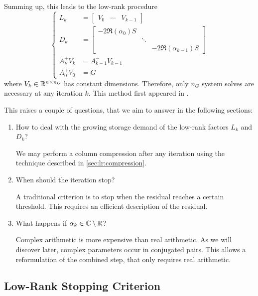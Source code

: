 Summing up,
this leads to the low-rank procedure
\begin{equation}
\label{eq:adi:si-lr-adi}
\left\{
\begin{aligned}
  L_k &= \begin{bmatrix}
    V_0 &
    \cdots &
    V_{k-1}
  \end{bmatrix} \\
  D_k &= \begin{bmatrix}
    -2 \Re(\alpha_0) S \\
    & \ddots \\
    && -2 \Re(\alpha_{k-1}) S
  \end{bmatrix} \\
  A_k^+ V_k &= A_{k-1}^- V_{k-1} \\
  A_0^+ V_0 &= G
\end{aligned}
\right.
\end{equation}
where $V_k \in\mathbb{R}^{n\times n_G}$ has constant dimensions.
Therefore, only $n_G$ system solves are necessary at any iteration $k$.
This method first appeared in \cite[Section~5]{Benner2009}.

This raises a couple of questions,
that we aim to answer in the following sections:
\begin{enumerate}
  \item
    How to deal with the growing storage demand of the low-rank factors $L_k$ and $D_k$?

    We may perform a column compression after any iteration using the technique described in \autoref{sec:lr:compression}.
  \item
    When should the iteration stop?

    A traditional criterion is to stop when the residual reaches a certain threshold.
    This requires an efficient description of the residual.
  \item
    What happens if $\alpha_k\in\mathbb{C}\setminus\mathbb{R}$?

    Complex arithmetic is more expensive than real arithmetic.
    As we will discover later, complex parameters occur in conjugated pairs.
    This allows a reformulation of the combined step,
    that only requires real arithmetic.
\end{enumerate}

\subsection{Low-Rank Stopping Criterion}
\label{sec:adi:lrstop}

